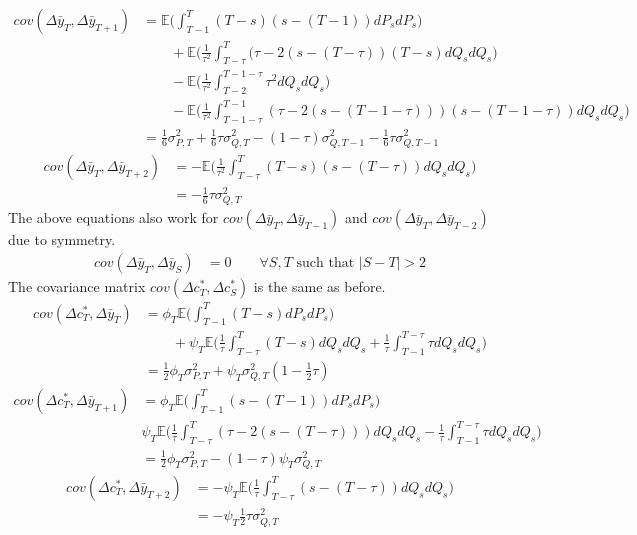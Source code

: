 \begin{align}
cov(\Delta \bar{y}_T, \Delta \bar{y}_{T+1}) &=  \mathbb{E} \Big(\int_{T-1}^{T} (T-s)(s-(T-1)) dP_s dP_s  \Big) \nonumber \\
&  \qquad +\mathbb{E} \Big(\frac{1}{\tau^2}\int_{T-\tau}^{T} (\tau - 2(s-(T-\tau))(T-s)  dQ_s dQ_s  \Big)\nonumber\\
& \qquad -\mathbb{E} \Big(\frac{1}{\tau^2}\int_{T-2}^{T-1-\tau} \tau^2 dQ_s dQ_s \Big)\nonumber \\
& \qquad -\mathbb{E} \Big(\frac{1}{\tau^2} \int_{T-1-\tau}^{T-1} (\tau - 2(s-(T-1-\tau))) (s-(T-1-\tau))dQ_sdQ_s \Big) \nonumber \\
&= \frac{1}{6}\sigma^2_{P,T} +\frac{1}{6}\tau\sigma^2_{Q,T} - (1-\tau)\sigma^2_{Q,T-1} -\frac{1}{6}\tau\sigma^2_{Q,T-1}
\end{align}
\begin{align}
cov(\Delta \bar{y}_T, \Delta \bar{y}_{T+2}) &=  -\mathbb{E} \Big(\frac{1}{\tau^2}\int_{T-\tau}^{T} (T-s)(s-(T-\tau)) dQ_s dQ_s  \Big) \nonumber \\
&= -\frac{1}{6}\tau \sigma^2_{Q,T}
\end{align}
The above equations also work for $cov(\Delta \bar{y}_T, \Delta \bar{y}_{T-1})$ and $cov(\Delta \bar{y}_T, \Delta \bar{y}_{T-2})$ due to symmetry.
\begin{align}
cov(\Delta \bar{y}_T, \Delta \bar{y}_{S}) &= 0 \qquad \forall S,T \text{ such that }|S-T| >2 
\end{align}
The covariance matrix $cov(\Delta c^*_T, \Delta c^*_{S})$ is the same as before.
\begin{align}
cov(\Delta c_T^*, \Delta \bar{y}_T) &= \phi_T \mathbb{E} \Big(  \int_{T-1}^{T} (T-s) dP_s dP_s \Big) \nonumber \\
& \qquad + \psi_T \mathbb{E}\Big(\frac{1}{\tau}\int_{T-\tau}^{T} (T-s)dQ_s dQ_s +\frac{1}{\tau}\int_{T-1}^{T-\tau} \tau dQ_s dQ_s \Big) \nonumber \\
&= \frac{1}{2} \phi_T \sigma^2_{P,T} + \psi_T \sigma^2_{Q,T} (1-\frac{1}{2}\tau )
\end{align}
\begin{align}
cov(\Delta c_T^*, \Delta \bar{y}_{T+1}) &=  \phi_T \mathbb{E} \Big(  \int_{T-1}^{T} (s-(T-1)) dP_s dP_s \Big) \nonumber \\
&  \psi_T \mathbb{E} \Big(  \frac{1}{\tau} \int_{T-\tau}^{T} (\tau - 2(s-(T-\tau)))dQ_s dQ_s -\frac{1}{\tau} \int_{T-1}^{T-\tau} \tau dQ_s dQ_s \Big) \nonumber \\
&= \frac{1}{2} \phi_T \sigma^2_{P,T} - (1-\tau) \psi_T \sigma^2_{Q,T}
\end{align}
\begin{align}
cov(\Delta c_T^*, \Delta \bar{y}_{T+2}) &=  -\psi_T \mathbb{E} \Big(  \frac{1}{\tau} \int_{T-\tau}^{T} (s-(T-\tau)) dQ_s dQ_s\Big) \nonumber \\
&= -\psi_T  \frac{1}{2}\tau \sigma^2_{Q,T}
\end{align}